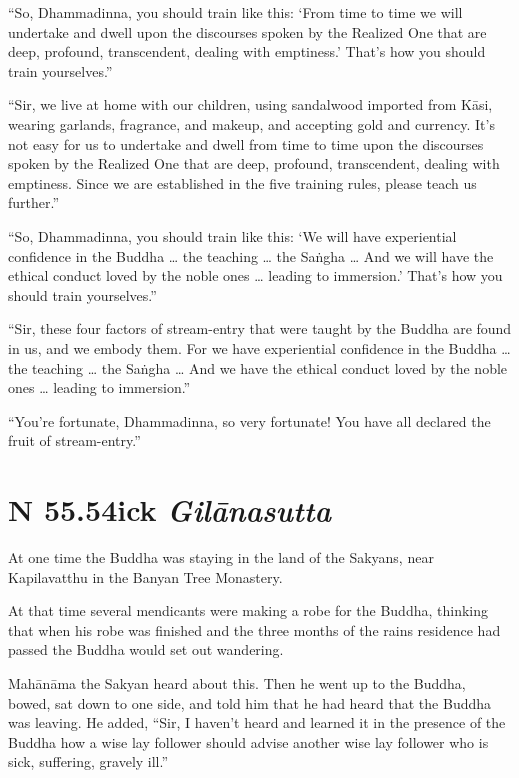 \documentclass[12pt,openany]{book}%
\newcommand*{\suttatitleacronym}[1]{\smaller[2]{#1}\vspace*{.3em}}
\newcommand*{\suttatitletranslation}[1]{\linebreak{#1}}
\newcommand*{\suttatitleroot}[1]{\linebreak\smaller[2]\itshape{#1}}
\newcommand*{\tocacronym}[1]{\hspace*{-3.3em}{#1}\quad}
\newcommand*{\toctranslation}[1]{#1}
\newcommand*{\tocroot}[1]{(\textit{#1})}
\begin{document}
“So, Dhammadinna, you should train like this: ‘From time to time we will undertake and dwell upon the discourses spoken by the Realized One that are deep, profound, transcendent, dealing with emptiness.’ That’s how you should train yourselves.” 

“Sir, we live at home with our children, using sandalwood imported from \textsanskrit{Kāsi}, wearing garlands, fragrance, and makeup, and accepting gold and currency. It’s not easy for us to undertake and dwell from time to time upon the discourses spoken by the Realized One that are deep, profound, transcendent, dealing with emptiness. Since we are established in the five training rules, please teach us further.” 

“So, Dhammadinna, you should train like this: ‘We will have experiential confidence in the Buddha … the teaching … the \textsanskrit{Saṅgha} … And we will have the ethical conduct loved by the noble ones … leading to immersion.’ That’s how you should train yourselves.” 

“Sir, these four factors of stream-entry that were taught by the Buddha are found in us, and we embody them. For we have experiential confidence in the Buddha … the teaching … the \textsanskrit{Saṅgha} … And we have the ethical conduct loved by the noble ones … leading to immersion.” 

“You’re fortunate, Dhammadinna, so very fortunate! You have all declared the fruit of stream-entry.” 

%
\section*{{\suttatitleacronym SN 55.54}{\suttatitletranslation Sick }{\suttatitleroot Gilānasutta}}
\addcontentsline{toc}{section}{\tocacronym{SN 55.54} \toctranslation{Sick } \tocroot{Gilānasutta}}

At one time the Buddha was staying in the land of the Sakyans, near Kapilavatthu in the Banyan Tree Monastery. 

At that time several mendicants were making a robe for the Buddha, thinking that when his robe was finished and the three months of the rains residence had passed the Buddha would set out wandering. 

\textsanskrit{Mahānāma} the Sakyan heard about this. Then he went up to the Buddha, bowed, sat down to one side, and told him that he had heard that the Buddha was leaving. He added, “Sir, I haven’t heard and learned it in the presence of the Buddha how a wise lay follower should advise another wise lay follower who is sick, suffering, gravely ill.” 
\end{document}
